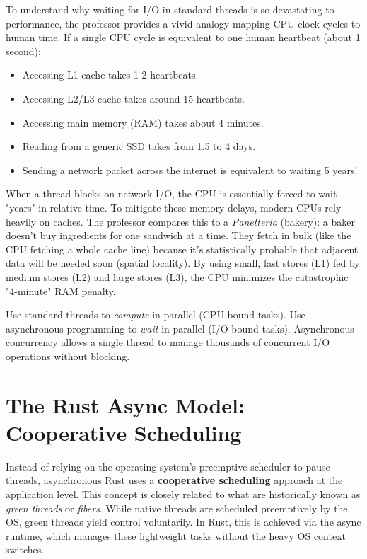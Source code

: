 \begin{insightbox}
To understand why waiting for I/O in standard threads is so devastating to performance, the professor provides a vivid analogy mapping CPU clock cycles to human time. If a single CPU cycle is equivalent to one human heartbeat (about 1 second):
\begin{itemize}
    \item Accessing L1 cache takes 1-2 heartbeats.
    \item Accessing L2/L3 cache takes around 15 heartbeats.
    \item Accessing main memory (RAM) takes about 4 minutes.
    \item Reading from a generic SSD takes from 1.5 to 4 days.
    \item Sending a network packet across the internet is equivalent to waiting 5 years!
\end{itemize}
When a thread blocks on network I/O, the CPU is essentially forced to wait "years" in relative time. To mitigate these memory delays, modern CPUs rely heavily on caches. The professor compares this to a \textit{Panetteria} (bakery): a baker doesn't buy ingredients for one sandwich at a time. They fetch in bulk (like the CPU fetching a whole cache line) because it's statistically probable that adjacent data will be needed soon (spatial locality). By using small, fast stores (L1) fed by medium stores (L2) and large stores (L3), the CPU minimizes the catastrophic "4-minute" RAM penalty.
\end{insightbox}

\begin{insightbox}
Use standard threads to \textit{compute} in parallel (CPU-bound tasks). Use asynchronous programming to \textit{wait} in parallel (I/O-bound tasks). Asynchronous concurrency allows a single thread to manage thousands of concurrent I/O operations without blocking.
\end{insightbox}

\section{The Rust Async Model: Cooperative Scheduling}

Instead of relying on the operating system's preemptive scheduler to pause threads, asynchronous Rust uses a \textbf{cooperative scheduling} approach at the application level. This concept is closely related to what are historically known as \textit{green threads} or \textit{fibers}. While native threads are scheduled preemptively by the OS, green threads yield control voluntarily. In Rust, this is achieved via the async runtime, which manages these lightweight tasks without the heavy OS context switches.

